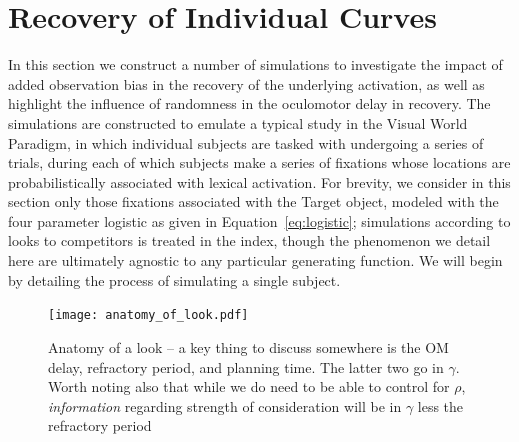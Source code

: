 %
%
%


%
\section{Recovery of Individual Curves}

In this section we construct a number of simulations to investigate the impact of added observation bias in the recovery of the underlying activation, as well as highlight the influence of randomness in the oculomotor delay in recovery. The simulations are constructed to emulate a typical study in the Visual World Paradigm, in which individual subjects are tasked with undergoing a series of trials, during each of which subjects make a series of fixations whose locations are probabilistically associated with lexical activation. For brevity, we consider in this section only those fixations associated with the Target object, modeled with the four parameter logistic as given in Equation~\ref{eq:logistic}; simulations according to looks to competitors is treated in the index, though the phenomenon we detail here are ultimately agnostic to any particular generating function. We will begin by detailing the process of simulating a single subject. 


\begin{figure}[H]
\centering
\texttt{[image: anatomy\_of\_look.pdf]}
\caption{Anatomy of a look -- a key thing to discuss somewhere is the OM delay, refractory period, and planning time. The latter two go in $\gamma$. Worth noting also that while we do need to be able to control for $\rho$, \textit{information} regarding strength of consideration will be in $\gamma$ less the refractory period}
\label{fig:anatomy_of_look}
\end{figure}


